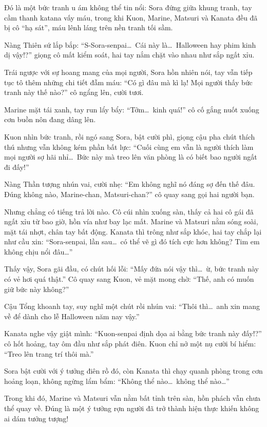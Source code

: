 \documentclass[../main.tex]{subfiles}
\begin{document}
Đó là một bức tranh u ám không thể tin nổi: Sora đứng giữa khung tranh, tay cầm thanh katana vấy máu, trong khi Kuon, Marine, Matsuri và Kanata đều đã bị cô ``hạ sát'', máu lênh láng trên nền tranh tối sầm.

Nàng Thiên sứ lắp bắp: ``S-Sora-senpai\dots\ Cái này là\dots\ Halloween hay phim kinh dị vậy!?'' giọng cô mất kiểm soát, hai tay nắm chặt vào nhau như sắp ngất xỉu.

Trái ngược với sự hoang mang của mọi người, Sora hồn nhiên nói, tay vẫn tiếp tục tô thêm những chi tiết đẫm máu: ``Có gì đâu mà kì lạ! Mọi người thấy bức tranh này thế nào?'' cô ngẩng lên, cười tươi.

Marine mặt tái xanh, tay run lẩy bẩy: ``Tởm\dots\ kinh quá!'' cô cố gắng nuốt xuống cơn buồn nôn đang dâng lên.

Kuon nhìn bức tranh, rồi ngó sang Sora, bật cười phì, giọng cậu pha chút thích thú nhưng vẫn không kém phần bất lực: ``Cuối cùng em vẫn là người thích làm mọi người sợ hãi nhỉ\dots\ Bức này mà treo lên văn phòng là có biết bao người ngất đi đấy!''

Nàng Thần tượng nhún vai, cười nhẹ: ``Em không nghĩ nó đáng sợ đến thế đâu. Đúng không nào, Marine-chan, Matsuri-chan?'' cô quay sang gọi hai người bạn.

Nhưng chẳng có tiếng trả lời nào. Cô cúi nhìn xuống sàn, thấy cả hai cô gái đã ngất xỉu từ bao giờ, hồn vía như bay lạc mất. Marine và Matsuri nằm sóng soài, mặt tái nhợt, chân tay bất động. Kanata thì trông như sắp khóc, hai tay chắp lại như cầu xin: ``Sora-senpai, lần sau\dots\ có thể vẽ gì đó tích cực hơn không? Tim em không chịu nổi đâu\dots''

Thấy vậy, Sora gãi đầu, có chút hối lỗi: ``Mấy đứa nói vậy thì\dots\ ừ, bức tranh này có vẻ hơi quá thật.'' Cô quay sang Kuon, vẻ mặt mong chờ: ``Thế, anh có muốn giữ bức này không?''

Cậu Tổng khoanh tay, suy nghĩ một chút rồi nhún vai: ``Thôi thì\dots\ anh xin mang về để dành cho lễ Halloween năm nay vậy.''

Kanata nghe vậy giật mình: ``Kuon-senpai định dọa ai bằng bức tranh này đấy!?'' cô hốt hoảng, tay ôm đầu như sắp phát điên. Kuon chỉ nở một nụ cười bí hiểm: ``Treo lên trang trí thôi mà.''

Sora bật cười với ý tưởng điên rồ đó, còn Kanata thì chạy quanh phòng trong cơn hoảng loạn, không ngừng lẩm bẩm: ``Không thể nào\dots\ không thể nào\dots''

Trong khi đó, Marine và Matsuri vẫn nằm bất tỉnh trên sàn, hồn phách vẫn chưa thể quay về. Đúng là một ý tưởng rợn người đã trở thành hiện thực khiến không ai dám tưởng tượng!
\end{document}
